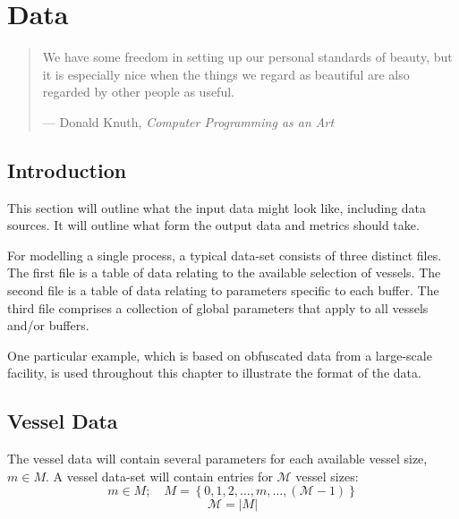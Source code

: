 %
%
%
%

\chapter{Data}\label{C.data}

\begin{quote}
We have some freedom in setting up our personal standards of beauty, but it is
especially nice when the things we regard as beautiful are also regarded by
other people as useful.

\hspace{2cm}--- Donald Knuth, \emph{Computer Programming as an Art}
\end{quote}

\section{Introduction}\label{S.intro3}

This section will outline what the input data might look like, including data
sources.
It will outline what form the output data and metrics should take.

For modelling a single process, a typical data-set consists of three distinct
files.
The first file is a table of data relating to the available selection of
vessels.
The second file is a table of data relating to parameters specific
to each buffer.
The third file comprises a collection of global parameters
that apply to all vessels and/or buffers.

One particular example, which is based on obfuscated data from a large-scale
facility, is used throughout this chapter to illustrate the format of the data.

\section{Vessel Data}\label{S.vesseldata}
The vessel data will contain several parameters for each available vessel size,
$m \in M$.
A vessel data-set will contain entries for $\mathcal{M}$ vessel sizes:
\begin{equation}
    m \in M; \quad M = \left\{ 0, 1, 2, \ldots, m, \ldots, \left(
    \mathcal{M} - 1 \right) \right\}
\end{equation}
\begin{equation}
    \mathcal{M} = |M|
\end{equation}

